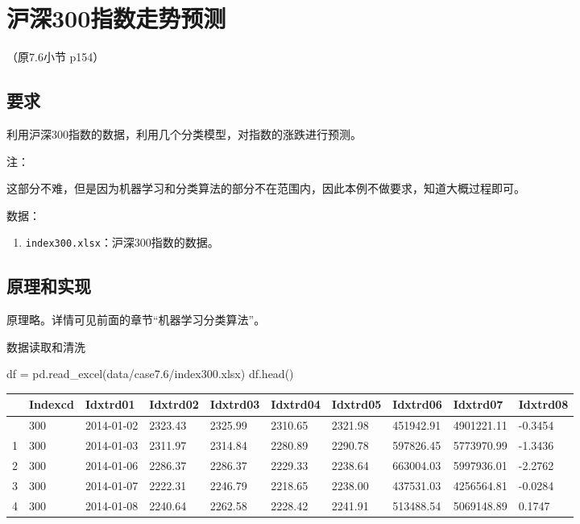 \documentclass[
  letterpaper,
  DIV=11,
  numbers=noendperiod]{scrreprt}
\newenvironment{Shaded}{\begin{snugshade}}{\end{snugshade}}
\newcommand{\NormalTok}[1]{\textcolor[rgb]{0.00,0.23,0.31}{#1}}
\newcommand{\OperatorTok}[1]{\textcolor[rgb]{0.37,0.37,0.37}{#1}}
\newcommand{\StringTok}[1]{\textcolor[rgb]{0.13,0.47,0.30}{#1}}
\providecommand{\tightlist}{%
  \setlength{\itemsep}{0pt}\setlength{\parskip}{0pt}}\usepackage{longtable,booktabs,array}
\begin{document}
\hypertarget{ux6caaux6df1300ux6307ux6570ux8d70ux52bfux9884ux6d4b}{%
\section{沪深300指数走势预测}\label{ux6caaux6df1300ux6307ux6570ux8d70ux52bfux9884ux6d4b}}

（原7.6小节 p154）

\hypertarget{ux8981ux6c42-4}{%
\subsection{要求}\label{ux8981ux6c42-4}}

利用沪深300指数的数据，利用几个分类模型，对指数的涨跌进行预测。

注：

这部分不难，但是因为机器学习和分类算法的部分不在范围内，因此本例不做要求，知道大概过程即可。

数据：

\begin{enumerate}
\def\labelenumi{\arabic{enumi}.}
\tightlist
\item
  \texttt{index300.xlsx}：沪深300指数的数据。
\end{enumerate}

\hypertarget{ux539fux7406ux548cux5b9eux73b0-1}{%
\subsection{原理和实现}\label{ux539fux7406ux548cux5b9eux73b0-1}}

原理略。详情可见前面的章节``机器学习分类算法''。

数据读取和清洗

\begin{Shaded}
\begin{Highlighting}[]
\NormalTok{df }\OperatorTok{=}\NormalTok{ pd.read\_excel(}\StringTok{\textquotesingle{}data/case7.6/index300.xlsx\textquotesingle{}}\NormalTok{)}
\NormalTok{df.head()}
\end{Highlighting}
\end{Shaded}

\begin{longtable}[]{@{}llllllllll@{}}
\toprule\noalign{}
& Indexcd & Idxtrd01 & Idxtrd02 & Idxtrd03 & Idxtrd04 & Idxtrd05 &
Idxtrd06 & Idxtrd07 & Idxtrd08 \\
\midrule\noalign{}
\endhead
\bottomrule\noalign{}
\endlastfoot
0 & 300 & 2014-01-02 & 2323.43 & 2325.99 & 2310.65 & 2321.98 & 451942.91
& 4901221.11 & -0.3454 \\
1 & 300 & 2014-01-03 & 2311.97 & 2314.84 & 2280.89 & 2290.78 & 597826.45
& 5773970.99 & -1.3436 \\
2 & 300 & 2014-01-06 & 2286.37 & 2286.37 & 2229.33 & 2238.64 & 663004.03
& 5997936.01 & -2.2762 \\
3 & 300 & 2014-01-07 & 2222.31 & 2246.79 & 2218.65 & 2238.00 & 437531.03
& 4256564.81 & -0.0284 \\
4 & 300 & 2014-01-08 & 2240.64 & 2262.58 & 2228.42 & 2241.91 & 513488.54
& 5069148.89 & 0.1747 \\
\end{longtable}
\end{document}
